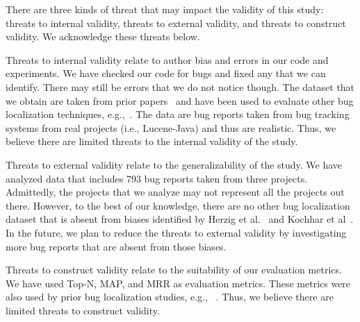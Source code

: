 There are three kinds of threat that may impact the validity of this study: threats to internal validity, threats to external validity, and threats to construct validity. We acknowledge these threats below.

Threats to internal validity relate to author bias and errors in our code and experiments. We have checked our code for bugs and fixed any that we can identify. There may still be errors that we do not notice though. The dataset that we obtain are taken from prior papers~\cite{zhou2012should,KochharTL14} and have been used to evaluate other bug localization techniques, e.g.,~\cite{zhou2012should,SahaLKP14,huo2016learning}. The data are bug reports taken from bug tracking systems from real projects (i.e., Lucene-Java) and thus are realistic. Thus, we believe there are limited threats to the internal validity of the study. 

Threats to external validity relate to the generalizability of the study. We have analyzed data that includes 793 bug reports taken from three projects. Admittedly, the projects that we analyze may not represent all the projects out there. However, to the best of our knowledge, there are no other bug localization dataset that is absent from biases identified by Herzig et al.~\cite{HerzigJZ13} and Kochhar et al~\cite{KochharTL14}. In the future, we plan to reduce the threats to external validity by investigating more bug reports that are absent from those biases. %

Threats to construct validity relate to the suitability of our evaluation metrics. We have used Top-N, MAP, and MRR as evaluation metrics. These metrics were also used by prior bug localization studies, e.g.,  ~\cite{zhou2012should,SahaLKP14,huo2016learning}. Thus, we believe there are limited threats to construct validity. 